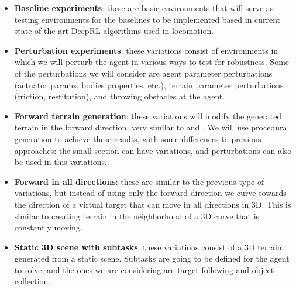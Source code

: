 \begin{itemize}
    \item \textbf{Baseline experiments}: these are basic environments that will serve
          as testing environments for the baselines to be implemented based in current
          state of the art DeepRL algorithms used in locomotion.

        \figTerrainParameterizationZero

    \item \textbf{Perturbation experiments}: these variations consist of environments
        in which we will perturb the agent in various ways to test for robustness. Some
        of the perturbations we will consider are agent parameter perturbations (actuator
        params, bodies properties, etc.), terrain parameter perturbations (friction,
        restitution), and throwing obstacles at the agent.

        \figTerrainParameterizationOne

    \item \textbf{Forward terrain generation}: these variations will modify the generated
        terrain in the forward direction, very similar to \citeauthor{DeepmindEmergenceLocomotion}
        and \citeauthor{DeepTerrainRL}. We will use procedural generation to achieve these
        results, with some differences to previous approaches: the small section can have
        variations, and perturbations can also be used in this variations.

        \figTerrainParameterizationTwo

    \item \textbf{Forward in all directions}: these are similar to the previous type of 
        variations, but instead of using only the forward direction we curve towards the direction
        of a virtual target that can move in all directions in 3D. This is similar to
        creating terrain in the neighborhood of a 3D curve that is constantly moving.

        \figTerrainParameterizationThree

    \item \textbf{Static 3D scene with subtasks}: these variations consist of a 3D terrain
        generated from a static scene. Subtasks are going to be defined for the agent to solve,
        and the ones we are considering are target following and object collection.

        \figTerrainParameterizationFour
\end{itemize}


